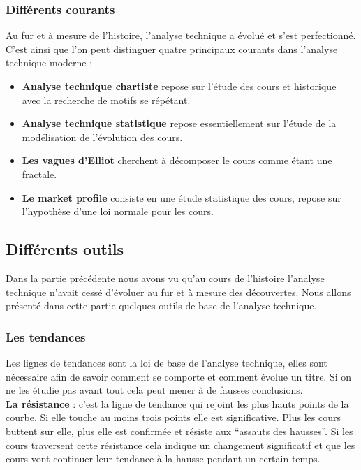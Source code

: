 \subsubsection{Différents courants}

Au fur et à mesure de l'histoire, l'analyse technique a évolué et s'est perfectionné. C'est ainsi que l'on peut distinguer quatre principaux courants dans l'analyse technique moderne :
\begin{itemize}
\item \textbf{Analyse technique chartiste} repose sur l'étude des cours et historique avec la recherche de motifs se répétant.  
\item \textbf{Analyse technique statistique} repose essentiellement sur l'étude de la modélisation de l'évolution des cours.
\item \textbf{Les vagues d'Elliot} cherchent à décomposer le cours comme étant une fractale.
\item \textbf{Le market profile} consiste en une étude statistique des cours, repose sur l'hypothèse d'une loi normale pour les cours. 
\end{itemize}

\subsection{Différents outils}
Dans la partie précédente nous avons vu qu'au cours de l'histoire l'analyse technique n'avait cessé d'évoluer au fur et à mesure des découvertes. Nous allons présenté dans cette partie quelques outils de base de l'analyse technique. \\

\subsubsection{Les tendances}
Les lignes de tendances sont la loi de base de l’analyse technique, elles sont nécessaire afin de savoir comment se comporte et comment évolue un titre. Si on ne les étudie pas avant tout cela peut mener à de fausses conclusions. \\

\textbf{La résistance} : c’est la ligne de tendance qui rejoint les plus hauts points de la courbe. Si elle touche au moins trois points elle est significative. Plus les cours buttent sur elle, plus elle est confirmée et résiste aux “assauts des hausses”. Si les cours traversent cette résistance cela indique un changement significatif et que les cours vont continuer leur tendance à la hausse pendant un certain temps. \\

